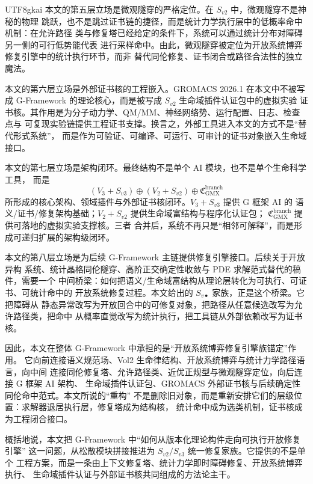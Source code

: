 \documentclass[12pt]{article}
\newcommand{\GFramework}{\textsf{G-Framework}}
\begin{document}
\begin{CJK*}{UTF8}{gkai}
本文的第五层立场是微观隧穿的严格定位。在 \(S_{v2}\) 中，微观隧穿不是神秘的物理
跳跃，也不是跳过证书链的捷径，而是统计力学执行层中的低概率命中机制：在允许路径
类与修复塔已经给定的条件下，系统可以通过统计分布对障碍另一侧的可行低势能代表
进行采样命中。由此，微观隧穿被定位为开放系统博弈修复引擎中的统计执行环节，而非
替代同伦修复、证书闭合或路径合法性的独立魔法。

本文的第六层立场是外部证书核的工程嵌入。GROMACS 2026.1 在本文中不被写成
\GFramework{} 的理论核心，而是被写成 \(S_{v2}\) 生命域插件认证包中的虚拟实验
证书核。其作用是为分子动力学、QM/MM、神经网络势、运行配置、日志、检查点与
可复现实验链提供工程证书支撑。换言之，外部工具进入本文的方式不是“替代形式系统”，
而是作为可验证、可编译、可运行、可审计的证书对象嵌入生命域接口。

本文的第七层立场是架构闭环。最终结构不是单个 AI 模块，也不是单个生命科学工具，
而是
\[
  (V_3+S_{v3})
  \oplus
  (V_2+S_{v2})
  \oplus
  \mathfrak C_{\mathrm{GMX}}^{\mathrm{branch}}
\]
所形成的核心架构、领域插件与外部证书核闭环。\(V_3+S_{v3}\) 提供 G 框架 AI 的
语义/证书/修复架构基础；\(V_2+S_{v2}\) 提供生命域富结构与程序化认证包；
\(\mathfrak C_{\mathrm{GMX}}^{\mathrm{branch}}\) 提供可落地的虚拟实验支撑核。三者
合并后，系统不再只是“相邻可解释”，而是形成可递归扩展的架构级闭环。

本文的第八层立场是为后续 \GFramework{} 主链提供修复引擎接口。后续关于开放异构
系统、统计晶格同伦隧穿、高阶正交确定性收敛与 PDE 求解范式替代的稿件，需要一个
中间桥梁：如何把语义/生命域富结构从理论层转化为可执行、可证书、可统计命中的
开放系统修复过程。本文给出的 \(S_{v\bullet}\) 家族，正是这个桥梁。它把障碍从
静态异常改写为开放回合中的可修复对象，把路径从任意候选改写为允许路径类，把命中
从概率直觉改写为统计执行，把工具链从外部依赖改写为证书核。

因此，本文在整体 \GFramework{} 中承担的是“开放系统博弈修复引擎族锚定”作用。
它向前连接语义规范场、Vol2 生命律结构、开放系统博弈与统计力学路径语言，向中间
连接同伦修复塔、允许路径类、近优正规型与微观隧穿定位，向后连接 G 框架 AI 架构、
生命域插件认证包、GROMACS 外部证书核与后续确定性同伦命中范式。本文所说的“重构”
不是删除旧对象，而是重新安排它们的层级位置：求解器退居执行层，修复塔成为结构核，
统计命中成为选类机制，证书核成为工程闭合接口。

概括地说，本文把 \GFramework{} 中“如何从版本化理论构件走向可执行开放修复引擎”
这一问题，从松散模块拼接推进为 \(S_{v2}/S_{v3}\) 统一修复家族。它提供的不是单个
工程方案，而是一条由上下文修复塔、统计力学即时障碍修复、开放系统博弈执行、
生命域插件认证与外部证书核共同组成的方法论主干。


\end{CJK*}
\end{document}
